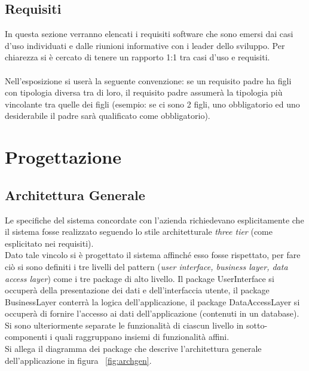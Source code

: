 \documentclass[a4paper,13pt,twoside]{article}
\begin{document}
\subsection{Requisiti} \label{sec:req}
In questa sezione verranno elencati i requisiti software che sono emersi dai casi d'uso individuati e dalle riunioni informative con i leader dello sviluppo. Per chiarezza si è cercato di tenere un rapporto 1:1 tra casi d'uso e requisiti.
 \\ \\Nell'esposizione si userà la seguente convenzione: se un requisito padre ha figli con tipologia diversa tra di loro, il requisito padre assumerà la tipologia più vincolante tra quelle dei figli (esempio: se ci sono 2 figli, uno obbligatorio ed uno desiderabile il padre sarà qualificato come obbligatorio).
 

\newpage

\newpage

\newpage

\section{Progettazione} \label{sec:progett}

\subsection{Architettura Generale} \label{sec:archgen}
Le specifiche del sistema concordate con l'azienda richiedevano esplicitamente che il sistema fosse realizzato seguendo lo stile architetturale \textit{three tier} (come esplicitato nei requisiti).  \\
Dato tale vincolo si è progettato il sistema affinché esso fosse rispettato, per fare ciò si sono definiti i tre livelli del pattern (\textit{user interface, business layer, data access layer}) come i tre package di alto livello. Il package UserInterface si occuperà della presentazione dei dati e dell'interfaccia utente, il package BusinessLayer conterrà la logica dell'applicazione, il package DataAccessLayer si occuperà di fornire l'accesso ai dati dell'applicazione (contenuti in un database). Si sono ulteriormente separate le funzionalità di ciascun livello in sotto-componenti i quali raggruppano insiemi di funzionalità affini. \\
Si allega il diagramma dei package che descrive l'architettura generale dell'applicazione in figura ~\ref{fig:archgen}.\\\\
\end{document}
